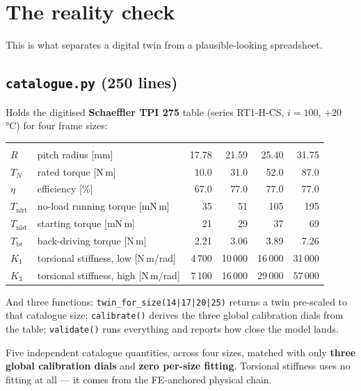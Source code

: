 \documentclass[11pt,a4paper]{article}
\newcommand{\pkg}[1]{\texttt{#1}}
\begin{document}
\section{The reality check}

This is what separates a digital twin from a plausible-looking spreadsheet.

\subsection{\pkg{catalogue.py} (250 lines)}

Holds the digitised \textbf{Schaeffler TPI 275} table (series RT1-H-CS,
$i = 100$, $+20$\,°C) for four frame sizes:

\begin{tabularx}{\textwidth}{@{}l Y r r r r@{}}
 &  &  &  &
 &  \\
$R$ & pitch radius [mm] & 17.78 & 21.59 & 25.40 & 31.75 \\
$T_N$ & rated torque [N\,m] & 10.0 & 31.0 & 52.0 & 87.0 \\
$\eta$ & efficiency [\%] & 67.0 & 77.0 & 77.0 & 77.0 \\
$T_\mathrm{nlrt}$ & no-load running torque [mN\,m] & 35 & 51 & 105 & 195 \\
$T_\mathrm{nlst}$ & starting torque [mN\,m] & 21 & 29 & 37 & 69 \\
$T_\mathrm{bt}$ & back-driving torque [N\,m] & 2.21 & 3.06 & 3.89 & 7.26 \\
$K_1$ & torsional stiffness, low [N\,m/rad] & 4\,700 & 10\,000 & 16\,000 &
31\,000 \\
$K_3$ & torsional stiffness, high [N\,m/rad] & 7\,100 & 16\,000 & 29\,000 &
57\,000 \\
\end{tabularx}

\vspace{8pt}
\noindent And three functions: \pkg{twin\_for\_size(14|17|20|25)} returns a twin
pre-scaled to that catalogue size; \pkg{calibrate()} derives the three global
calibration dials from the table; \pkg{validate()} runs everything and reports
how close the model lands.

\begin{keyresult}
Five independent catalogue quantities, across four sizes, matched with only
\textbf{three global calibration dials} and \textbf{zero per-size fitting}.
Torsional stiffness uses no fitting at all --- it comes from the FE-anchored
physical chain.
\end{keyresult}
\end{document}
